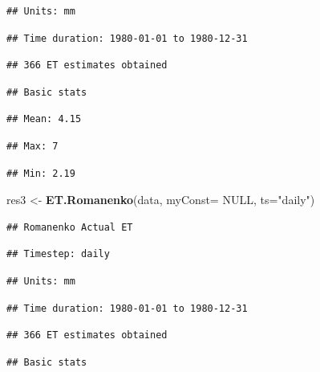 \documentclass[
]{book}
\newenvironment{Shaded}{\begin{snugshade}}{\end{snugshade}}
\newcommand{\DataTypeTok}[1]{\textcolor[rgb]{0.13,0.29,0.53}{#1}}
\newcommand{\KeywordTok}[1]{\textcolor[rgb]{0.13,0.29,0.53}{\textbf{#1}}}
\newcommand{\NormalTok}[1]{#1}
\newcommand{\OtherTok}[1]{\textcolor[rgb]{0.56,0.35,0.01}{#1}}
\newcommand{\StringTok}[1]{\textcolor[rgb]{0.31,0.60,0.02}{#1}}
\begin{document}
\begin{verbatim}
## Units: mm
\end{verbatim}

\begin{verbatim}
## Time duration: 1980-01-01 to 1980-12-31
\end{verbatim}

\begin{verbatim}
## 366 ET estimates obtained
\end{verbatim}

\begin{verbatim}
## Basic stats
\end{verbatim}

\begin{verbatim}
## Mean: 4.15
\end{verbatim}

\begin{verbatim}
## Max: 7
\end{verbatim}

\begin{verbatim}
## Min: 2.19
\end{verbatim}

\begin{Shaded}
\begin{Highlighting}[]
\NormalTok{res3 <-}\StringTok{ }\KeywordTok{ET.Romanenko}\NormalTok{(data, }\DataTypeTok{myConst=} \OtherTok{NULL}\NormalTok{, }\DataTypeTok{ts=}\StringTok{"daily"}\NormalTok{)}
\end{Highlighting}
\end{Shaded}

\begin{verbatim}
## Romanenko Actual ET
\end{verbatim}

\begin{verbatim}
## Timestep: daily
\end{verbatim}

\begin{verbatim}
## Units: mm
\end{verbatim}

\begin{verbatim}
## Time duration: 1980-01-01 to 1980-12-31
\end{verbatim}

\begin{verbatim}
## 366 ET estimates obtained
\end{verbatim}

\begin{verbatim}
## Basic stats
\end{verbatim}
\end{document}
